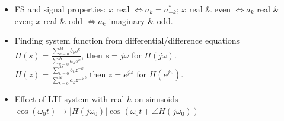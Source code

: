 \documentclass[10pt, twocolumn]{article}
\begin{document}
\begin{itemize}
    \item FS and signal properties: $x$ real $\Leftrightarrow a_k=a_{-k}^*$; $x$ real \& even $\Leftrightarrow a_k$ real \& even; $x$ real \& odd $\Leftrightarrow a_k$ imaginary \& odd.
    \item Finding system function from differential/difference equations \\
    $H(s) = \frac{\sum_{k=0}^M b_k s^k}{\sum_{k=0}^N a_k s^k}$, then $s=j\omega$ for $H(j\omega)$. \\
    $H(z) = \frac{\sum_{k=0}^M b_k z^{-k}}{\sum_{k=0}^N a_k z^{-k}}$, then $z=e^{j\omega}$ for $H(e^{j\omega})$.
    \item Effect of LTI system with real $h$ on sinusoids \\
    $\cos(\omega_0 t) \to |H(j\omega_0)| \cos(\omega_0 t + \angle H(j\omega_0))$
\end{itemize}

\end{document}
